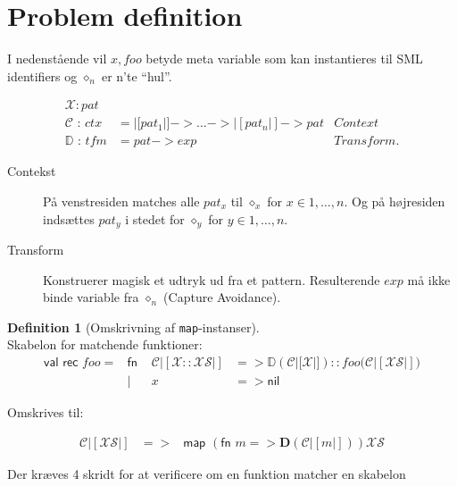 \documentclass[oneside]{memoir}
\theoremstyle{definition}
\newtheorem{definition}{Definition}
\begin{document}
\section{Problem definition}


I nedenstående vil $\mathit{x}, \mathit{foo}$ betyde meta variable som kan
instantieres til SML identifiers og $\diamond_n$ er n'te ``hul''.

\begin{eqnarray*}[rlqTl]
  \mathcal{X} : pat & \\
  \mathcal{C} \textit{ : ctx} & = |[pat_1|] -> \ldots -> |[pat_n|] -> pat & Context \\
  \mathbb{D} \textit{ : tfm} & = pat -> exp & Transform.
\end{eqnarray*}


\begin{description}
\item[Contekst] På venstresiden matches alle $pat_x$ til $\diamond_x$ for $x \in
  {1,\ldots, n}$. Og på højresiden indsættes $pat_y$ i stedet for $\diamond_y$
  for $y \in {1, \ldots, n}$.
\item[Transform] Konstruerer magisk et udtryk ud fra et pattern. Resulterende
  $exp$ må ikke binde variable fra $\diamond_n$ (Capture Avoidance).
\end{description}


\begin{definition}[Omskrivning af \texttt{map}-instanser] \ \\
  Skabelon for matchende funktioner:
  \begin{eqnarray*}[rrll]
    \textsf{val rec }\mathit{foo} = & \textsf{fn } & \mathcal{C} |[ \mathcal{X} ::
    \mathcal{X\!S}|] &  => \mathbb{D} (\mathcal{C}|[ \mathcal{X} |]) :: \mathit{foo}(\mathcal{C}
    |[ \mathcal{X\!S} |]\mathsf{)} \\
    & \textsf{| } & x & => \mathsf{nil}
  \end{eqnarray*}

Omskrives til:

\begin{eqnarray*}
  \mathcal{C}|[\mathcal{X\!S}|] &=>& \textsf{map } \left( \textsf{fn } m =>
    \mathbf{D}\left( \mathcal{C}|[m|] \right) \right) \mathcal{X\!S}
\end{eqnarray*}
\end{definition}


Der kræves 4 skridt for at verificere om en funktion matcher en skabelon
\end{document}
